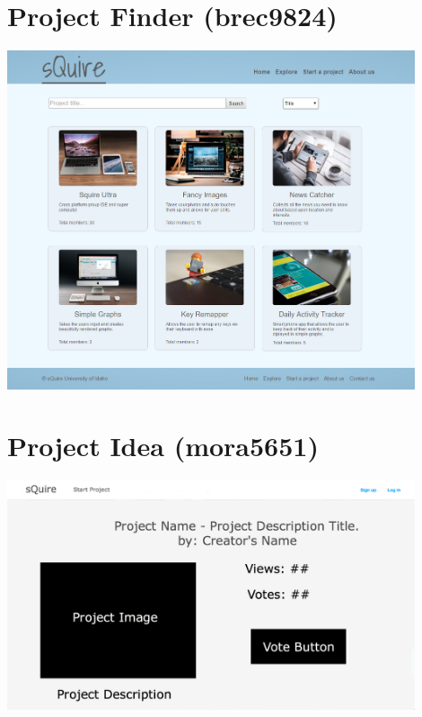 \documentclass[11pt]{report}
\begin{document}
    \section{Project Finder (brec9824)}
    \begin{minipage}{1\textwidth}
        \begin{center}
            \includegraphics[width=0.9\textwidth]{mockups/mockup-projectfinder-brec9824}
        \end{center}
    \end{minipage}
    
    \section{Project Idea (mora5651)}
    \begin{minipage}{1\textwidth}
        \begin{center}
            \includegraphics[width=0.9\textwidth]{mockups/mockup-ProjectIdea-mora5651}
        \end{center}
    \end{minipage}
\end{document}
